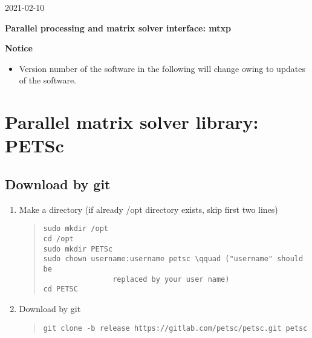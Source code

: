 \documentclass[11pt]{article}
\begin{document}
\begin{flushright}
2021-02-10
\end{flushright}

\begin{center}
{\Large \bf Parallel processing and matrix solver interface: mtxp}
\end{center}

\tableofcontents

\bigskip
\begin{center}
\textbf{Notice}
\end{center}
\begin{itemize}
\item
Version number of the software in the following will change owing to
updates of the software.
\end{itemize}
\bigskip

\section{Parallel matrix solver library: PETSc}

\subsection{Download by git}

\begin{enumerate}
\item
Make a directory (if already /opt directory exists, skip first two lines)
\begin{quote}
\begin{verbatim}
sudo mkdir /opt
cd /opt
sudo mkdir PETSc
sudo chown username:username petsc \qquad ("username" should be
                replaced by your user name)
cd PETSC
\end{verbatim}
\end{quote}
\item
  Download by git
\begin{quote}
\begin{verbatim}
git clone -b release https://gitlab.com/petsc/petsc.git petsc
\end{verbatim}
\end{quote}
\end{enumerate}
\end{document}
